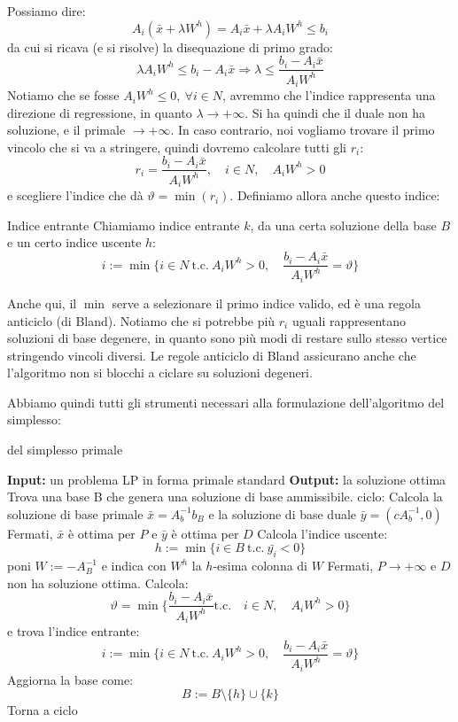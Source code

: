 \documentclass[a4paper,11pt]{article}
\begin{document}
\begin{itemize}
Possiamo dire:
$$
A_i \left( \bar{x} + \lambda W^h \right) = A_i \bar{x} + \lambda A_i W^h \leq b_i
$$
da cui si ricava (e si risolve) la disequazione di primo grado:
$$
\lambda A_i W^h \leq b_i - A_i \bar{x} \Rightarrow \lambda \leq \frac{b_i - A_i \bar{x}}{A_i W^h}
$$
Notiamo che se fosse $A_i W^h \leq 0, \ \forall i \in N$, avremmo che l'indice rappresenta una direzione di regressione, in quanto $\lambda \rightarrow +\infty$.
Si ha quindi che il duale non ha soluzione, e il primale $\rightarrow +\infty$.
In caso contrario, noi vogliamo trovare il primo vincolo che si va a stringere, quindi dovremo calcolare tutti gli $r_i$:
$$
r_i = \frac{b_i - A_i \bar{x}}{A_i W^h}, \quad i \in N, \quad A_i W^h > 0
$$
e scegliere l'indice che dà $\vartheta = \min(r_i)$.
Definiamo allora anche questo indice:
\begin{definition}{Indice entrante}
	Chiamiamo indice entrante $k$, da una certa soluzione della base $B$ e un certo indice uscente $h$:
	$$
	i := \min\{ i \in N \ \text{t.c.} \ A_i W^h > 0, \quad \frac{b_i - A_i \bar{x}}{A_i W^h} = \vartheta \}	
	$$
\end{definition}
Anche qui, il $\min$ serve a selezionare il primo indice valido, ed è una regola anticiclo (di Bland).
Notiamo che si potrebbe più $r_i$ uguali rappresentano soluzioni di base degenere, in quanto sono più modi di restare sullo stesso vertice stringendo vincoli diversi.
Le regole anticiclo di Bland assicurano anche che l'algoritmo non si blocchi a ciclare su soluzioni degeneri.
\end{itemize}

Abbiamo quindi tutti gli strumenti necessari alla formulazione dell'algoritmo del simplesso:
\begin{algorithm}
\caption{del simplesso primale}
\begin{algorithmic}
	\STATE \textbf{Input:} un problema LP in forma primale standard
	\STATE \textbf{Output:} la soluzione ottima 
	\STATE Trova una base B che genera una soluzione di base ammissibile.
	\STATE \textsf{ciclo:}
	\STATE Calcola la soluzione di base primale $\bar{x} = A_b^{-1} b_B$ e la soluzione di base duale $\bar{y} = (cA_b^{-1}, 0)$
		\STATE Fermati, $\bar{x}$ è ottima per $P$ e $\bar{y}$ è ottima per $D$
	\ELSE
		\STATE Calcola l'indice uscente: 
		$$
		h := \min\{ i \in B \ \text{t.c.} \ \bar{y_i} < 0 \}
		$$
		poni $W := -A_B^{-1}$ e indica con $W^h$ la $h$-esima colonna di $W$
	\ENDIF
		\STATE Fermati, $P \rightarrow +\infty$ e $D$ non ha soluzione ottima.
	\ELSE
		\STATE Calcola:
		$$
		\vartheta = \min\{ \frac{b_i - A_i \bar{x}}{A_i W^h} \text{t.c.} \quad i \in N, \quad A_i W^h > 0 \}
		$$
		e trova l'indice entrante: 
		$$ 
		i := \min\{ i \in N \ \text{t.c.} \ A_i W^h > 0, \quad \frac{b_i - A_i \bar{x}}{A_i W^h} = \vartheta \} 
		$$
	\ENDIF
	\STATE Aggiorna la base come:
	$$
	B := B \setminus \{h\} \cup \{k\}
	$$
	\STATE Torna a \textsf{ciclo}
\end{algorithmic}
\end{algorithm}
\end{document}
